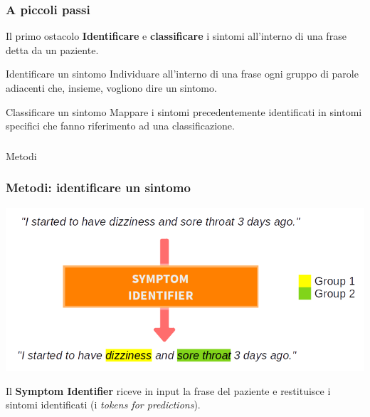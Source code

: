 \documentclass{beamer}
\begin{document}
\begin{frame}
\frametitle{A piccoli passi}

\begin{block}{Il primo ostacolo}
\textbf{Identificare} e \textbf{classificare} i sintomi all'interno di una frase detta da un paziente.
\end{block} \pause

\begin{exampleblock}{Identificare un sintomo}
Individuare all'interno di una frase ogni gruppo di parole adiacenti che, insieme, vogliono dire un sintomo.
\end{exampleblock}\pause

\begin{exampleblock}{Classificare un sintomo}
Mappare i sintomi precedentemente identificati in sintomi specifici che fanno riferimento ad una classificazione.
\end{exampleblock}

\end{frame}

\begin{frame}[c]
\frametitle{}

\begin{center}
\Huge Metodi
\end{center}

\end{frame}

\begin{frame}
\frametitle{Metodi: identificare un sintomo}

\includegraphics[width=\textwidth]{images/symptom_identifier.png}

Il \textbf{Symptom Identifier} riceve in input la frase del paziente e restituisce i sintomi identificati (i \emph{tokens for predictions}).

\end{frame}
\end{document}
